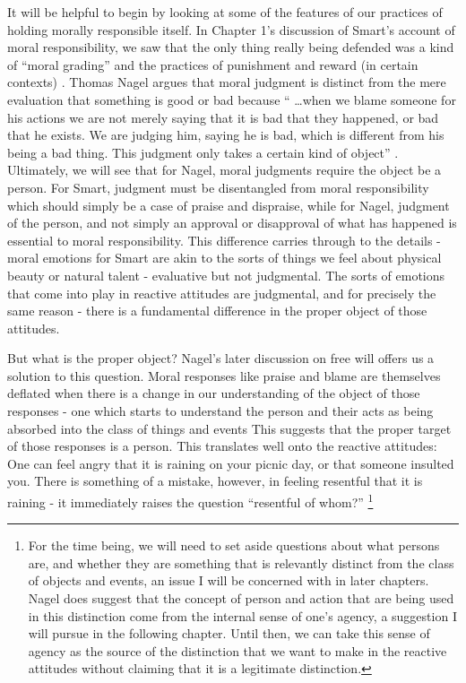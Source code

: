 \documentclass[phd,12pt,oneside,paper=letterpaper]{ubcthesis}
\begin{document}
It will be helpful to begin by looking at some of the features of our practices of holding morally responsible itself. In Chapter 1's discussion of Smart's account of moral responsibility, we saw that the only thing really being defended was a kind of ``moral grading'' and the practices of punishment and reward (in certain contexts) \citep{smart1961}. Thomas Nagel argues that moral judgment is distinct from the mere evaluation that something is good or bad because `` …when we blame someone for his actions we are not merely saying that it is bad that they happened, or bad that he exists. We are judging him, saying he is bad, which is different from his being a bad thing. This judgment only takes a certain kind of object'' \citep[67]{nagel1979b}. Ultimately, we will see that for Nagel, moral judgments require the object be a person. For Smart, judgment must be disentangled from moral responsibility which should simply be a case of praise and dispraise, while for Nagel, judgment of the person, and not simply an approval or disapproval of what has happened is essential to moral responsibility. This difference carries through to the details - moral emotions for Smart are akin to the sorts of things we feel about physical beauty or natural talent - evaluative but not judgmental. The sorts of emotions that come into play in reactive attitudes are judgmental, and for precisely the same reason - there is a fundamental difference in the proper object of those attitudes.

But what is the proper object? Nagel's later discussion on free will offers us a solution to this question. Moral responses like praise and blame are themselves deflated when there is a change in our understanding of the object of those responses - one which starts to understand the person and their acts as being absorbed into the class of things and events \citep[67]{nagel1979b} This suggests that the proper target of those responses is a person. This translates well onto the reactive attitudes: One can feel angry that it is raining on your picnic day, or that someone insulted you. There is something of a mistake, however, in feeling resentful that it is raining - it immediately raises the question ``resentful of whom?'' \footnote{For the time being, we will need to set aside questions about what persons are, and whether they are something that is relevantly distinct from the class of objects and events, an issue I will be concerned with in later chapters. Nagel does suggest that the concept of person and action that are being used in this distinction come from the internal sense of one's agency, a suggestion I will pursue in the following chapter. Until then, we can take this sense of agency as the source of the distinction that we want to make in the reactive attitudes without claiming that it is a legitimate distinction.}
\end{document}
